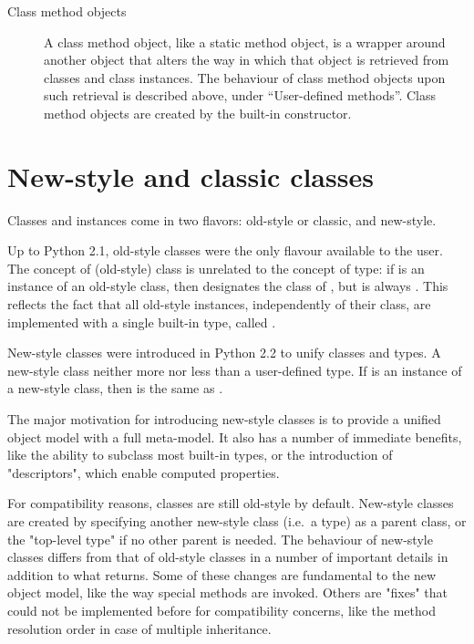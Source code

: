 \begin{description}
\begin{description}
\item[Class method objects]
A class method object, like a static method object, is a wrapper
around another object that alters the way in which that object
is retrieved from classes and class instances. The behaviour of
class method objects upon such retrieval is described above,
under ``User-defined methods''. Class method objects are created
by the built-in  constructor.

\end{description} %

\end{description} %

\section{New-style and classic classes}

Classes and instances come in two flavors: old-style or classic, and new-style.  

Up to Python 2.1, old-style classes were the only flavour available to the
user.  The concept of (old-style) class is unrelated to the concept of type: if
 is an instance of an old-style class, then 
designates the class of , but  is always .  This reflects the fact that all old-style instances,
independently of their class, are implemented with a single built-in type,
called .

New-style classes were introduced in Python 2.2 to unify classes and types.  A
new-style class neither more nor less than a user-defined type.  If  is
an instance of a new-style class, then  is the same as
.

The major motivation for introducing new-style classes is to provide a unified
object model with a full meta-model.  It also has a number of immediate
benefits, like the ability to subclass most built-in types, or the introduction
of "descriptors", which enable computed properties.

For compatibility reasons, classes are still old-style by default.  New-style
classes are created by specifying another new-style class (i.e.\ a type) as a
parent class, or the "top-level type"  if no other parent is
needed.  The behaviour of new-style classes differs from that of old-style
classes in a number of important details in addition to what 
returns.  Some of these changes are fundamental to the new object model, like
the way special methods are invoked.  Others are "fixes" that could not be
implemented before for compatibility concerns, like the method resolution order
in case of multiple inheritance.

